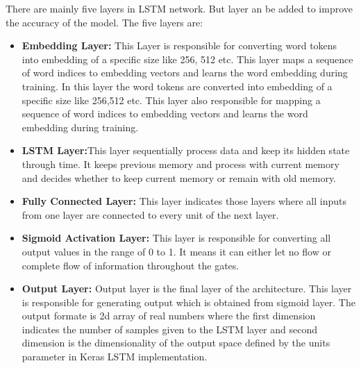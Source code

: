 There are mainly five layers in LSTM network. But layer an be added to improve the accuracy of the model. The five layers are:
\begin{itemize}
\item \textbf{Embedding Layer:} This Layer is responsible for converting word tokens into embedding of a specific size like 256, 512 etc. This layer maps a sequence of word indices to embedding vectors and learns the word embedding during training.
In this layer the word tokens are converted into embedding of a specific size like 256,512 etc. This layer also responsible for mapping a sequence of word indices to embedding vectors and learns the word embedding during training.

\item \textbf{LSTM Layer:}This layer sequentially process data and keep its hidden state through time. It keeps previous memory and process with current memory and decides whether to keep current memory or remain with old memory.
   
\item \textbf{Fully Connected Layer:} This layer indicates those layers where all inputs from one layer are connected to every unit of the next layer.

\item \textbf{Sigmoid Activation Layer:} This layer is responsible for converting all output values in the range of 0 to 1. It means it can either let no flow or complete flow of information throughout the gates.

\item \textbf{Output Layer:} Output layer is the final layer of the architecture. This layer is responsible for generating output which is obtained from sigmoid layer. The output formate is 2d array of real numbers where the first dimension indicates the number of samples given to the LSTM layer and second dimension is the dimensionality of the output space defined by the units
parameter in Keras LSTM implementation.
\end{itemize}






























